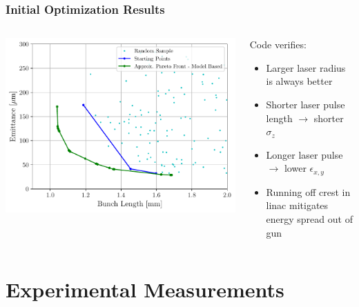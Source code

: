 \documentclass[professionalfonts,t]{beamer}
\begin{document}
\begin{frame}
	\frametitle{Initial Optimization Results}
\begin{columns}[T] %
	\begin{column}{.56\textwidth}
		\vspace{1em}
		\includegraphics[width=1.0\linewidth, right]{../images/pareto_emittance_vs_zrms}
	\end{column}%
	\hfill%
	\begin{column}{.44\textwidth}
		\vspace{1em}
		Code verifies:
		\begin{itemize}
		\item Larger laser radius is always better
		\item Shorter laser pulse length $\rightarrow$ shorter $\sigma_z$
		\item Longer laser pulse $\rightarrow$ lower $\epsilon_{x,y}$
		\item Running off crest in linac mitigates energy spread out of gun
	    \end{itemize}	
	\end{column}%
\end{columns}
\end{frame}
\section{Experimental Measurements}
\end{document}
